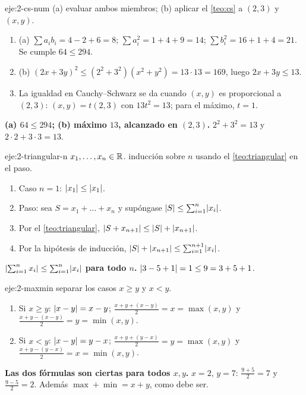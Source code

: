 \begin{solucion}{eje:2-cs-num}
\planteamiento (a) evaluar ambos miembros; (b) aplicar el \cref{teo:cs} a $(2,3)$ y $(x,y)$.
\pasos
\begin{enumerate}[label=\arabic*.]
  \item (a) $\sum a_ib_i=4-2+6=8$; $\sum a_i^2=1+4+9=14$; $\sum b_i^2=16+1+4=21$. Se cumple $64\le294$.
  \item (b) $(2x+3y)^2\le(2^2+3^2)(x^2+y^2)=13\cdot13=169$, luego $2x+3y\le13$.
  \item La igualdad en Cauchy--Schwarz se da cuando $(x,y)$ es proporcional a $(2,3)$: $(x,y)=t(2,3)$ con $13t^2=13$; para el máximo, $t=1$.
\end{enumerate}
\resultado \textbf{(a) $64\le294$; (b) máximo $13$, alcanzado en $(2,3)$.}
\comprobacion $2^2+3^2=13$ y $2\cdot2+3\cdot3=13$.
\end{solucion}

\begin{solucion}{eje:2-triangular-n}
\datos $x_1,\dots,x_n\in\mathbb{R}$.
\planteamiento inducción sobre $n$ usando el \cref{teo:triangular} en el paso.
\pasos
\begin{enumerate}[label=\arabic*.]
  \item Caso $n=1$: $\lvert x_1\rvert\le\lvert x_1\rvert$.
  \item Paso: sea $S=x_1+\dots+x_n$ y supóngase $\lvert S\rvert\le\sum_{i=1}^n\lvert x_i\rvert$.
  \item Por el \cref{teo:triangular}, $\lvert S+x_{n+1}\rvert\le\lvert S\rvert+\lvert x_{n+1}\rvert$.
  \item Por la hipótesis de inducción, $\lvert S\rvert+\lvert x_{n+1}\rvert\le\sum_{i=1}^{n+1}\lvert x_i\rvert$.
\end{enumerate}
\resultado \textbf{$\lvert\sum_{i=1}^nx_i\rvert\le\sum_{i=1}^n\lvert x_i\rvert$ para todo $n$.}
\comprobacion $\lvert3-5+1\rvert=1\le9=3+5+1$.
\end{solucion}

\begin{solucion}{eje:2-maxmin}
\planteamiento separar los casos $x\ge y$ y $x<y$.
\pasos
\begin{enumerate}[label=\arabic*.]
  \item Si $x\ge y$: $\lvert x-y\rvert=x-y$; $\frac{x+y+(x-y)}2=x=\max(x,y)$ y $\frac{x+y-(x-y)}2=y=\min(x,y)$.
  \item Si $x<y$: $\lvert x-y\rvert=y-x$; $\frac{x+y+(y-x)}2=y=\max(x,y)$ y $\frac{x+y-(y-x)}2=x=\min(x,y)$.
\end{enumerate}
\resultado \textbf{Las dos fórmulas son ciertas para todos $x,y$.}
\comprobacion $x=2$, $y=7$: $\frac{9+5}2=7$ y $\frac{9-5}2=2$. Además $\max+\min=x+y$, como debe ser.
\end{solucion}

